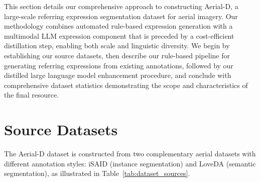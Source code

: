 \cleardoublepage
\label{chap:implement}

This section details our comprehensive approach to constructing Aerial-D, a large-scale referring expression segmentation dataset for aerial imagery. Our methodology combines automated rule-based expression generation with a multimodal LLM expression component that is preceded by a cost-efficient distillation step, enabling both scale and linguistic diversity. We begin by establishing our source datasets, then describe our rule-based pipeline for generating referring expressions from existing annotations, followed by our distilled large language model enhancement procedure, and conclude with comprehensive dataset statistics demonstrating the scope and characteristics of the final resource.

\section{Source Datasets}

The Aerial-D dataset is constructed from two complementary aerial datasets with different annotation styles: iSAID (instance segmentation) and LoveDA (semantic segmentation), as illustrated in Table~\ref{tab:dataset_sources}.


